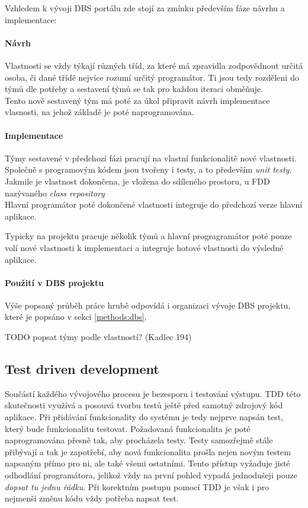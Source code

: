Vzhledem k vývoji DBS portálu zde stojí za zmínku především fáze návrhu a implementace:

\paragraph{Návrh}
Vlastnosti se vždy týkají různých tříd, za které má zpravidla zodpovědnout určitá osoba, či dané třídě nejvíce rozumí určitý programátor. Ti jsou tedy rozděleni do týmů dle potřeby a sestavení týmů se tak pro každou iteraci obměňuje.\\
Tento nově sestavený tým má poté za úkol připravit návrh implementace vlasnosti, na jehož základě je poté naprogramována.

\paragraph{Implementace}
Týmy sestavené v předchozí fázi pracují na vlastní funkcionalitě nové vlastnosti. Společně s programovým kódem jsou tvořeny i testy, a to především \emph{unit testy}.\\
Jakmile je vlastnost dokončena, je vložena do sdíleného prostoru, u FDD nazývaného \emph{class repository}\\
Hlavní programátor poté dokončené vlastnosti integruje do předchozí verze hlavní aplikace.

Typicky na projektu pracuje několik týmů a hlavní progragramátor poté pouze volí nové vlastnosti k implementaci a integruje hotové vlastnosti do výsledné aplikace.

\paragraph{Použití v DBS projektu}
Výše popsaný průběh práce hrubě odpovídá i organizaci vývoje DBS projektu, které je popsáno v sekci \ref{methods:dbs}.

TODO popsat týmy podle vlastností? (Kadlec 194)


\subsection{Test driven development} \label{methods:tdd}

Součástí každého vývojového procesu je bezesporu i testování výstupu. TDD této skutečnosti využívá a posouvá tvorbu testů ještě před samotný zdrojový kód aplikace. Při přidávání funkcionality do systému je tedy nejprve napsán test, který bude funkcionalitu testovat. Požadovaná funkcionalita je poté naprogramována přesně tak, aby procházela testy. Testy samozřejmě stále přibývají a tak je zapotřebí, aby nová funkcionalita prošla nejen novým testem napsaným přímo pro ni, ale také všemi ostatními.
Tento přístup vyžaduje jisté odhodlání programátora, jelikož vždy na první pohled vypadá jednodušeji pouze \emph{dopsat tu jednu řádku}. Při korektním postupu pomocí TDD je však i pro nejmenší změnu kódu vždy potřeba napsat test.

